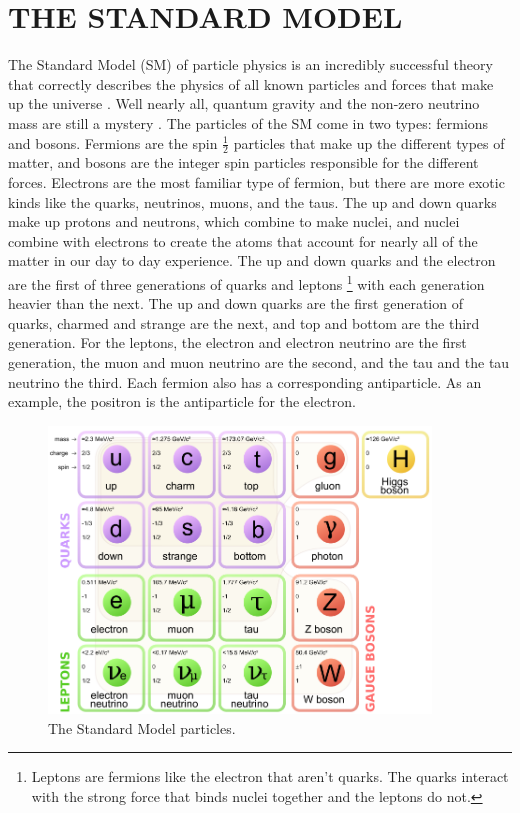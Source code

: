 \chapter{THE STANDARD MODEL} \label{sm}

The Standard Model (SM) of particle physics is an incredibly successful theory that correctly describes the physics of all known particles and forces that make up the universe \cite{smconsistency}. Well nearly all, quantum gravity and the non-zero neutrino mass are still a mystery \cite{smconsistency,smnograv,zee}. The particles of the SM come in two types: fermions and bosons. Fermions are the spin $\frac{1}{2}$ particles that make up the different types of matter, and bosons are the integer spin particles responsible for the different forces. Electrons are the most familiar type of fermion, but there are more exotic kinds like the quarks, neutrinos, muons, and the taus. The up and down quarks make up protons and neutrons, which combine to make nuclei, and nuclei combine with electrons to create the atoms that account for nearly all of the matter in our day to day experience. The up and down quarks and the electron are the first of three generations of quarks and leptons \footnote{Leptons are fermions like the electron that aren't quarks. The quarks interact with the strong force that binds nuclei together and the leptons do not.} with each generation heavier than the next. The up and down quarks are the first generation of quarks, charmed and strange are the next, and top and bottom are the third generation. For the leptons, the electron and electron neutrino are the first generation, the muon and muon neutrino are the second, and the tau and the tau neutrino the third. Each fermion also has a corresponding antiparticle. As an example, the positron is the antiparticle for the electron. 

\begin{figure}[h!]
  \centering
  \includegraphics[width=4in]{images/Standard_Model_of_Elementary_Particles.png}
  \caption[The Standard Model particles.]
   {The Standard Model particles.}
  \label{fig:smtable}
\end{figure}

